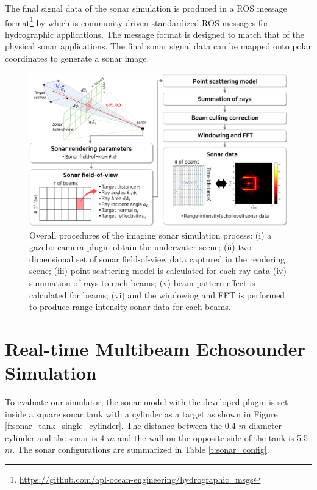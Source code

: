 \documentclass[utf8]{frontiersSCNS} %
\begin{document}
The final signal data of the sonar simulation is produced in a ROS message format\footnote{\url{https://github.com/apl-ocean-engineering/hydrographic_msgs}} by \cite{acousticmsgformat} which is community-driven standardized ROS messages for hydrographic applications. The message format is designed to match that of the physical sonar applications. The final sonar signal data can be mapped onto polar coordinates to generate a sonar image.

\begin{figure}
  \centering
  \includegraphics[width=\textwidth]{images/implementation.png}
  \caption{Overall procedures of the imaging sonar simulation process: (i) a gazebo camera plugin obtain the underwater scene; (ii) two dimensional set of sonar field-of-view data captured in the rendering scene; (iii) point scattering model is calculated for each ray data (iv) summation of rays to each beams; (v) beam pattern effect is calculated for beams; (vi) and the windowing and FFT is performed to produce range-intensity sonar data for each beams.}
  \label{f:implementation}
\end{figure} 

\section{Real-time Multibeam Echosounder Simulation}
To evaluate our simulator, the sonar model with the developed plugin is set inside a square sonar tank with a cylinder as a target as shown in Figure \ref{f:sonar_tank_single_cylinder}. The distance between the 0.4 $m$ diameter cylinder and the sonar is 4 $m$ and the wall on the opposite side of the tank is 5.5 $m$. The sonar configurations are summarized in Table \ref{t:sonar_config}.
\end{document}
